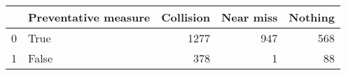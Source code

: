 \begin{tabular}{llrrr}
\toprule
{} &  Preventative measure &  Collision &  Near miss &  Nothing \\
\midrule
0 &                  True &       1277 &        947 &      568 \\
1 &                 False &        378 &          1 &       88 \\
\bottomrule
\end{tabular}
